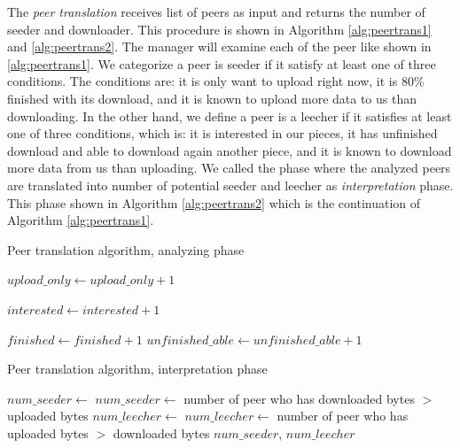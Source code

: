 The \textit{peer translation} receives list of peers as input and returns the number of seeder and downloader. This procedure is shown in Algorithm \ref{alg:peertrans1} and \ref{alg:peertrans2}. The manager will examine each of the peer like shown in \ref{alg:peertrans1}. We categorize a peer is seeder if it satisfy at least one of three conditions. The conditions are: it is only want to upload right now, it is 80\% finished with its download, and it is known to upload more data to us than downloading. In the other hand, we define a peer is a leecher if it satisfies at least one of three conditions, which is: it is interested in our pieces, it has unfinished download and able to download again another piece, and it is known to download more data from us than uploading. We called the phase where the analyzed peers are translated into number of potential seeder and leecher as \textit{interpretation} phase. This phase shown in Algorithm \ref{alg:peertrans2} which is the continuation of Algorithm \ref{alg:peertrans1}.

\begin{algorithm}[t]
	\caption{Peer translation algorithm, analyzing phase}
	\label{alg:peertrans1}
	\begin{algorithmic}[1]
		\Statex
			\State $upload\_only \gets upload\_only + 1$
			\EndIf	
			
			\State $interested \gets interested + 1$
			\EndIf	
			
			\State $finished \gets finished + 1$
			\Else
			\State $unfinished\_able \gets unfinished\_able + 1$
			\EndIf	
			\EndIf
		\EndFor
	\end{algorithmic}
\end{algorithm}

\begin{algorithm}[t]
	\caption{Peer translation algorithm, interpretation phase}
	\label{alg:peertrans2}
	\begin{algorithmic}[1]
		\State $num\_seeder \gets $ 
		\State $num\_seeder \gets $ number of peer who has downloaded bytes $>$ uploaded bytes
		\EndIf
		\State $num\_leecher \gets $ 
		\State $num\_leecher \gets $ number of peer who has uploaded bytes $>$ downloaded bytes
		\EndIf
		\State \Return $num\_seeder$, $num\_leecher$
	\EndFunction
	\end{algorithmic}
\end{algorithm}

